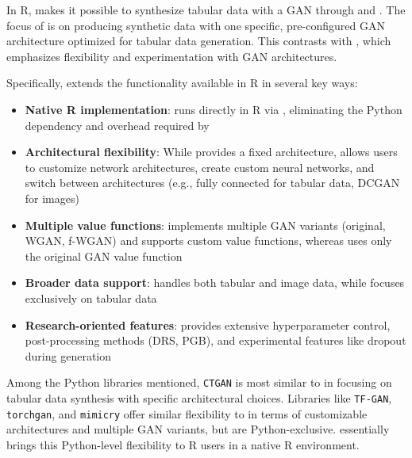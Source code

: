 In R,  \citep{ganGenerativeData} makes it possible to synthesize tabular data with a GAN through  and . The focus of  is on producing synthetic data with one specific, pre-configured GAN architecture optimized for tabular data generation. This contrasts with , which emphasizes flexibility and experimentation with GAN architectures.

Specifically,  extends the functionality available in R in several key ways:

\begin{itemize}
\tightlist
\item
  \textbf{Native R implementation}:  runs directly in R via , eliminating the Python dependency and  overhead required by 
\item
  \textbf{Architectural flexibility}: While  provides a fixed architecture,  allows users to customize network architectures, create custom neural networks, and switch between architectures (e.g., fully connected for tabular data, DCGAN for images)
\item
  \textbf{Multiple value functions}:  implements multiple GAN variants (original, WGAN, f-WGAN) and supports custom value functions, whereas  uses only the original GAN value function
\item
  \textbf{Broader data support}:  handles both tabular and image data, while  focuses exclusively on tabular data
\item
  \textbf{Research-oriented features}:  provides extensive hyperparameter control, post-processing methods (DRS, PGB), and experimental features like dropout during generation
\end{itemize}

Among the Python libraries mentioned, \texttt{CTGAN} is most similar to  in focusing on tabular data synthesis with specific architectural choices. Libraries like \texttt{TF-GAN}, \texttt{torchgan}, and \texttt{mimicry} offer similar flexibility to  in terms of customizable architectures and multiple GAN variants, but are Python-exclusive.  essentially brings this Python-level flexibility to R users in a native R environment.

